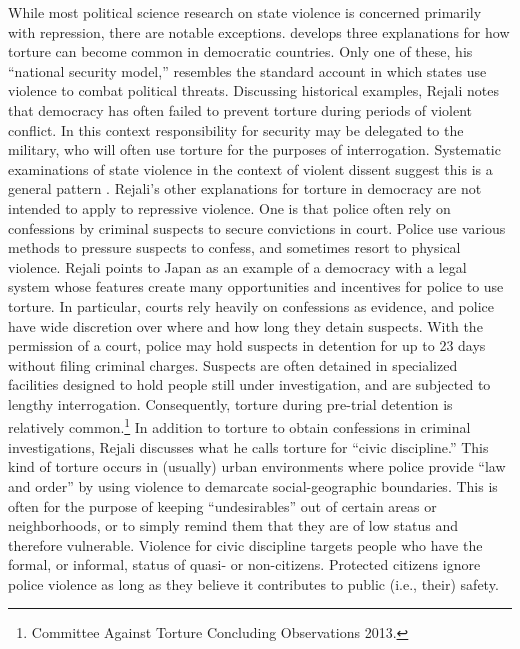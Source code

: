 \documentclass[11pt]{article}
\begin{document}
While most political science research on state violence is concerned primarily with repression, there are notable exceptions. \citet{Rejali2007} develops three explanations for how torture can become common in democratic countries. Only one of these, his ``national security model,'' resembles the standard account in which states use violence to combat political threats. Discussing historical examples, Rejali notes that democracy has often failed to prevent torture during periods of violent conflict. In this context responsibility for security may be delegated to the military, who will often use torture for the purposes of interrogation. Systematic examinations of state violence in the context of violent dissent suggest this is a general pattern \citep{Davenport2007,Davenport2007AR,DavenportMooreArmstrong2007,ConradMoore2010}. Rejali's other explanations for torture in democracy are not intended to apply to repressive violence. One is that police often rely on confessions by criminal suspects to secure convictions in court. Police use various methods to pressure suspects to confess, and sometimes resort to physical violence. Rejali points to Japan as an example of a democracy with a legal system whose features create many opportunities and incentives for police to use torture. In particular, courts rely heavily on confessions as evidence, and police have wide discretion over where and how long they detain suspects. With the permission of a court, police may hold suspects in detention for up to 23 days without filing criminal charges. Suspects are often detained in specialized facilities designed to hold people still under investigation, and are subjected to lengthy interrogation. Consequently, torture during pre-trial detention is relatively common.\footnote{Committee Against Torture Concluding Observations 2013.} In addition to torture to obtain confessions in criminal investigations, Rejali discusses what he calls torture for ``civic discipline.'' This kind of torture occurs in (usually) urban environments where police provide ``law and order'' by using violence to demarcate social-geographic boundaries. This is often for the purpose of keeping  ``undesirables'' out of certain areas or neighborhoods, or to simply remind them that they are of low status and therefore vulnerable. Violence for civic discipline targets people who have the formal, or informal, status of quasi- or non-citizens. Protected citizens ignore police violence as long as they believe it contributes to public (i.e., their) safety. 
\end{document}

